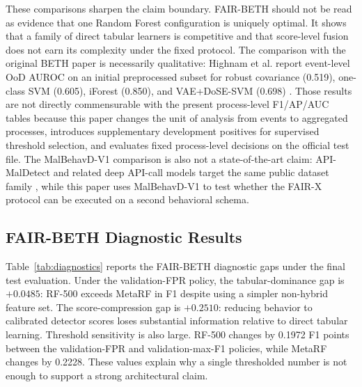 \documentclass[journal]{IEEEtran}
\begin{document}
These comparisons sharpen the claim boundary. FAIR-BETH should not be read as evidence that one Random Forest configuration is uniquely optimal. It shows that a family of direct tabular learners is competitive and that score-level fusion does not earn its complexity under the fixed protocol. The comparison with the original BETH paper is necessarily qualitative: Highnam et al. report event-level OoD AUROC on an initial preprocessed subset for robust covariance (0.519), one-class SVM (0.605), iForest (0.850), and VAE+DoSE-SVM (0.698) \cite{highnam2021}. Those results are not directly commensurable with the present process-level F1/AP/AUC tables because this paper changes the unit of analysis from events to aggregated processes, introduces supplementary development positives for supervised threshold selection, and evaluates fixed process-level decisions on the official test file. The MalBehavD-V1 comparison is also not a state-of-the-art claim: API-MalDetect and related deep API-call models target the same public dataset family \cite{maniriho2023}, while this paper uses MalBehavD-V1 to test whether the FAIR-X protocol can be executed on a second behavioral schema.

\subsection{FAIR-BETH Diagnostic Results}

Table~\ref{tab:diagnostics} reports the FAIR-BETH diagnostic gaps under the final test evaluation. Under the validation-FPR policy, the tabular-dominance gap is $+0.0485$: RF-500 exceeds MetaRF in F1 despite using a simpler non-hybrid feature set. The score-compression gap is $+0.2510$: reducing behavior to calibrated detector scores loses substantial information relative to direct tabular learning. Threshold sensitivity is also large. RF-500 changes by 0.1972 F1 points between the validation-FPR and validation-max-F1 policies, while MetaRF changes by 0.2228. These values explain why a single thresholded number is not enough to support a strong architectural claim.
\end{document}
